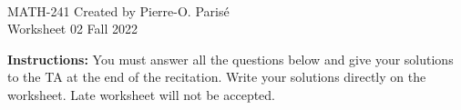 \documentclass[addpoints, 12pt]{exam}%
\theoremstyle{definition}
\begin{document}
	\noindent \hrulefill \\
	MATH-241 \hfill Created by Pierre-O. Paris{\'e}\\
	Worksheet 02 \hfill Fall 2022\\\vspace*{-0.7cm}
	
	\noindent\hrulefill
	
\vspace*{0.5cm}

\noindent{}

\vspace*{0.25cm}
\begin{center}
\gradetable[h][questions]
\end{center}
\vspace*{0.25cm}

{\bf Instructions:} You must answer all the questions below and give your solutions to the TA at the end of the recitation. Write your solutions directly on the worksheet. Late worksheet will not be accepted.


\vspace*{0.5cm}
\end{document}
